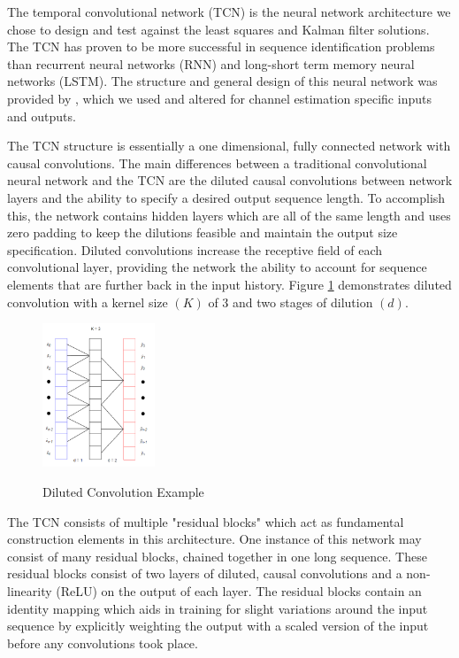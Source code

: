 \documentclass[twocolumn,letterpaper]{IEEEAerospaceCLS}  %
\begin{document}
The temporal convolutional network (TCN) is the neural network architecture we chose to design and test against the least squares and Kalman filter solutions. The TCN has proven to be more successful in sequence identification problems than recurrent neural networks (RNN) and long-short term memory neural networks (LSTM). The structure and general design of this neural network was provided by \cite{BaiTCN2018}, which we used and altered for channel estimation specific inputs and outputs. 

The TCN structure is essentially a one dimensional, fully connected network with causal convolutions. The main differences between a traditional convolutional neural network and the TCN are the diluted causal convolutions between network layers and the ability to specify a desired output sequence length. To accomplish this, the network contains hidden layers which are all of the same length and uses zero padding to keep the dilutions feasible and maintain the output size specification. Diluted convolutions increase the receptive field of each convolutional layer, providing the network the ability to account for sequence elements that are further back in the input history. Figure \ref{dilutedconv} demonstrates diluted convolution with a kernel size $(K)$ of 3 and two stages of dilution $(d)$.

\begin{figure}[!h]
	\centering\includegraphics[width=0.3\textwidth]{figs/dilutedconv.PNG}\\
	\caption{Diluted Convolution Example}
	\label{dilutedconv}
\end{figure}

The TCN consists of multiple "residual blocks" which act as fundamental construction elements in this architecture. One instance of this network may consist of many residual blocks, chained together in one long sequence. These residual blocks consist of two layers of diluted, causal convolutions and a non-linearity (ReLU) on the output of each layer. The residual blocks contain an identity mapping which aids in training for slight variations around the input sequence by explicitly weighting the output with a scaled version of the input before any convolutions took place. 
\end{document}
